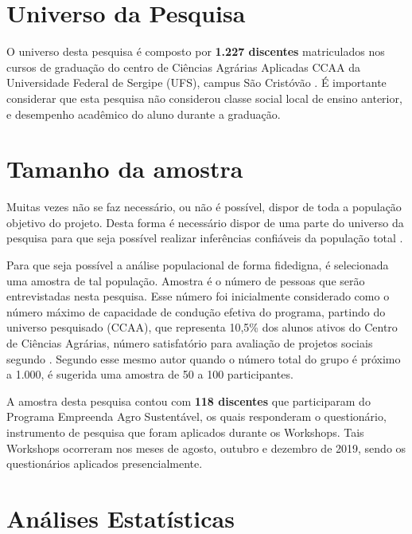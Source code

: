 \section{Universo da Pesquisa}

O universo desta pesquisa é composto por \textbf{1.227 discentes} matriculados nos cursos de graduação do centro de Ciências Agrárias Aplicadas CCAA da Universidade Federal de Sergipe (UFS), campus São Cristóvão \cite{andrade_ufs_2019}. É importante considerar que esta pesquisa não considerou classe social local de ensino anterior, e desempenho acadêmico do aluno durante a graduação.


\section{Tamanho da amostra}

Muitas  vezes  não  se  faz necessário,  ou não é possível, dispor de toda a população objetivo do projeto. Desta forma é necessário dispor de uma parte do universo da pesquisa para que seja possível realizar inferências confiáveis da população total \cite{marino_manual_2003}.

Para que seja possível a análise populacional de forma fidedigna, é selecionada uma amostra de tal população. Amostra é o número de pessoas que serão entrevistadas nesta pesquisa. Esse número foi inicialmente considerado como o número máximo de capacidade de condução efetiva do programa, partindo do universo pesquisado (CCAA), que  representa 10,5\% dos alunos ativos do Centro de Ciências Agrárias, número satisfatório para avaliação de projetos sociais segundo . Segundo esse mesmo autor quando o número total do grupo é próximo a 1.000, é sugerida uma amostra de 50 a 100 participantes.

A amostra desta pesquisa contou com \textbf{118 discentes} que participaram do Programa Empreenda Agro Sustentável, os quais responderam o questionário, instrumento de pesquisa que foram aplicados durante os Workshops. Tais Workshops ocorreram nos meses de agosto, outubro e dezembro de 2019, sendo os questionários aplicados presencialmente.

\section{Análises Estatísticas}


